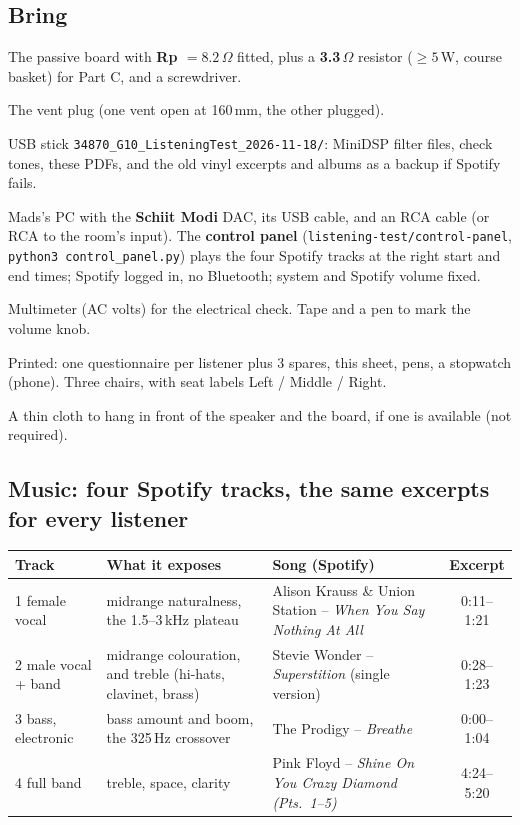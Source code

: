 \documentclass[11pt,a4paper]{article}
\begin{document}
\subsection*{Bring}
\begin{chk}
\item The passive board with \textbf{Rp $=8.2\,\Omega$} fitted, plus a \textbf{3.3\,$\Omega$} resistor ($\geq5$\,W, course basket) for Part C, and a screwdriver.
\item The vent plug (one vent open at 160\,mm, the other plugged).
\item USB stick \texttt{34870\_G10\_ListeningTest\_2026-11-18/}: MiniDSP filter files, check tones, these PDFs, and the old vinyl excerpts and albums as a backup if Spotify fails.
\item Mads's PC with the \textbf{Schiit Modi} DAC, its USB cable, and an RCA cable (or RCA to the room's input). The \textbf{control panel} (\texttt{listening-test/control-panel}, \texttt{python3 control\_panel.py}) plays the four Spotify tracks at the right start and end times; Spotify logged in, no Bluetooth; system and Spotify volume fixed.
\item Multimeter (AC volts) for the electrical check. Tape and a pen to mark the volume knob.
\item Printed: one questionnaire per listener plus 3 spares, this sheet, pens, a stopwatch (phone). Three chairs, with seat labels Left / Middle / Right.
\item A thin cloth to hang in front of the speaker and the board, if one is available (not required).
\end{chk}

\subsection*{Music: four Spotify tracks, the same excerpts for every listener}
\begin{tabularx}{\linewidth}{@{}l>{\raggedright}p{4.6cm}>{\raggedright\arraybackslash}Xc@{}}\toprule
Track & What it exposes & Song (Spotify) & Excerpt\\\midrule
1 female vocal & midrange naturalness, the 1.5--3\,kHz plateau & Alison Krauss \& Union Station -- \emph{When You Say Nothing At All} & 0:11--1:21\\
2 male vocal + band & midrange colouration, and treble (hi-hats, clavinet, brass) & Stevie Wonder -- \emph{Superstition} (single version) & 0:28--1:23\\
3 bass, electronic & bass amount and boom, the 325\,Hz crossover & The Prodigy -- \emph{Breathe} & 0:00--1:04\\
4 full band & treble, space, clarity & Pink Floyd -- \emph{Shine On You Crazy Diamond (Pts.\ 1--5)} & 4:24--5:20\\\bottomrule
\end{tabularx}
\end{document}
